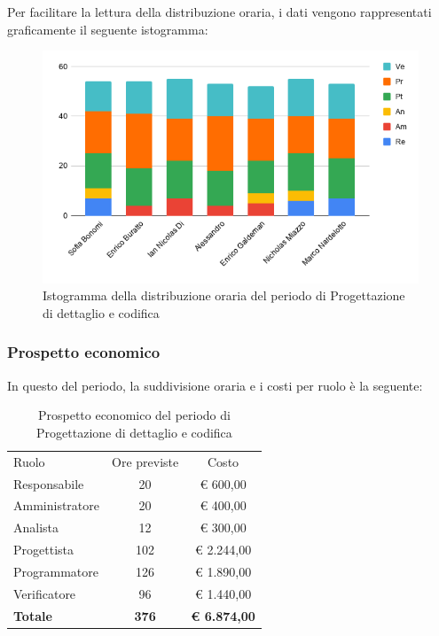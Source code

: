 \documentclass[../piano-di-progetto.tex]{subfiles}
\begin{document}
  Per facilitare la lettura della distribuzione oraria, i dati vengono rappresentati graficamente il seguente istogramma:
  \begin{figure}[H]
    \centering
    \includegraphics[width=12cm]{img/ore-codifica.png}
    \caption{Istogramma della distribuzione oraria del periodo di Progettazione di dettaglio e codifica}
    \label{fig:ore-componente-codifica}
  \end{figure}

  \subsubsection{Prospetto economico}
  In questo del periodo, la suddivisione oraria e i costi per ruolo è la seguente:

  \begin{table}[H]
    \centering
    \begin{tabular}{lcc}
      Ruolo           & Ore previste & Costo               \\
      Responsabile    & 20           & € 600,00            \\
      Amministratore  & 20           & € 400,00            \\
      Analista        & 12           & € 300,00            \\
      Progettista     & 102          & € 2.244,00          \\
      Programmatore   & 126          & € 1.890,00          \\
      Verificatore    & 96           & € 1.440,00          \\
      \textbf{Totale} & \textbf{376} & \textbf{€ 6.874,00}
    \end{tabular}
    \caption{Prospetto economico del periodo di Progettazione di dettaglio e codifica}
  \end{table}
\end{document}
